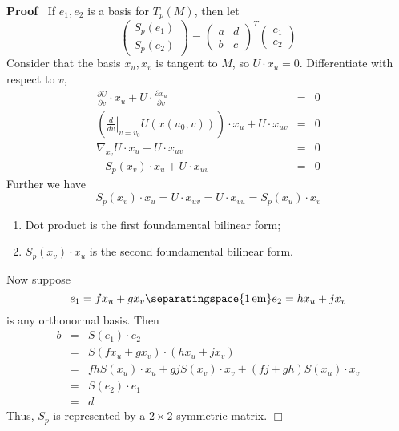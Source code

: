 \documentclass{article}
\newcommand{\tmop}[1]{\ensuremath{\operatorname{#1}}}
\newenvironment{enumeratenumeric}{\begin{enumerate}[1.] }{\end{enumerate}}
\newenvironment{proof}{\noindent\textbf{Proof\ }}{\hspace*{\fill}$\Box$\medskip}
\begin{document}
\begin{proof}
  If $e_1, e_2$ is a basis for $T_p (M)$, then let
  \[ \left(\begin{array}{c}
       S_p (e_1)\\
       S_p (e_2)
     \end{array}\right) = \left(\begin{array}{cc}
       a & d\\
       b & c
     \end{array}\right)^T \left(\begin{array}{c}
       e_1\\
       e_2
     \end{array}\right) \]
  Consider that the basis $x_u, x_v$ is tangent to $M$, so $U \cdot x_u = 0$.
  Differentiate with respect to $v$,
  \begin{eqnarray*}
    \frac{\partial U}{\partial v} \cdot x_u + U \cdot \frac{\partial
    x_u}{\partial v} & = & 0\\
    \left( \left. \frac{d}{d v} \right|_{v = v_0} U (x (u_0, v))_{} \right)
    \cdot x_u + U \cdot x_{u v} & = & 0\\
    \nabla_{x_v} U \cdot x_u + U \cdot x_{u v} & = & 0\\
    - S_p (x_v) \cdot x_u + U \cdot x_{u v} & = & 0
  \end{eqnarray*}
  Further we have
  \begin{equation}
    S_p (x_v) \cdot x_u = U \cdot x_{u v} = U \cdot x_{v u} = S_p (x_u) \cdot
    x_v
  \end{equation}
  \begin{enumeratenumeric}
    \item Dot product is the first foundamental bilinear form;
    
    \item $S_p (x_v) \cdot x_u$ is the second foundamental bilinear form.
  \end{enumeratenumeric}
  Now suppose
  \[ e_1 = f x_u + g x_v \separatingspace{1 \tmop{em}} e_2 = h x_u + j x_v \]
  is any orthonormal basis. Then
  \begin{eqnarray*}
    b & = & S (e_1) \cdot e_2\\
    & = & S (f x_u + g x_v) \cdot (h x_u + j x_v)\\
    & = & f h S (x_u) \cdot x_u + g j S (x_v) \cdot x_v + (f j + g h) S (x_u)
    \cdot x_v\\
    & = & S (e_2) \cdot e_1\\
    & = & d
  \end{eqnarray*}
  Thus, $S_p$ is represented by a $2 \times 2$ symmetric matrix.
\end{proof}
\end{document}
